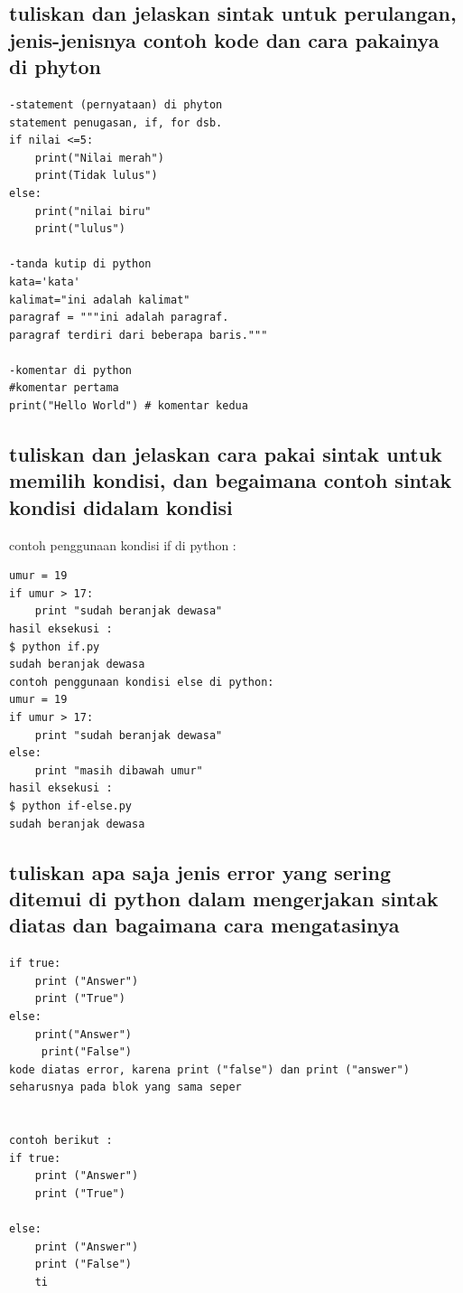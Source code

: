 \subsection{tuliskan dan jelaskan sintak untuk perulangan, jenis-jenisnya contoh kode dan cara pakainya di phyton}
\begin{lstlisting}
-statement (pernyataan) di phyton
statement penugasan, if, for dsb.
if nilai <=5:
    print("Nilai merah")
    print(Tidak lulus")
else:
    print("nilai biru"
    print("lulus")

-tanda kutip di python
kata='kata'
kalimat="ini adalah kalimat"
paragraf = """ini adalah paragraf.
paragraf terdiri dari beberapa baris."""

-komentar di python
#komentar pertama
print("Hello World") # komentar kedua
\end{lstlisting}

\subsection{tuliskan dan jelaskan cara pakai sintak untuk memilih kondisi, dan begaimana contoh sintak kondisi didalam kondisi}
contoh penggunaan kondisi if di python :
\begin{lstlisting}
umur = 19
if umur > 17:
    print "sudah beranjak dewasa"
hasil eksekusi :
$ python if.py
sudah beranjak dewasa
contoh penggunaan kondisi else di python:
umur = 19
if umur > 17:
    print "sudah beranjak dewasa"
else:
    print "masih dibawah umur"
hasil eksekusi :
$ python if-else.py
sudah beranjak dewasa
\end{lstlisting}

\subsection{tuliskan apa saja jenis error yang sering ditemui di python dalam mengerjakan sintak diatas dan bagaimana cara mengatasinya}
\begin{lstlisting}
if true:
    print ("Answer")
    print ("True")
else:
    print("Answer")
     print("False")
kode diatas error, karena print ("false") dan print ("answer") seharusnya pada blok yang sama seper


contoh berikut :
if true:
    print ("Answer")
    print ("True")

else:
    print ("Answer")
    print ("False")
    ti
\end{lstlisting}
    
